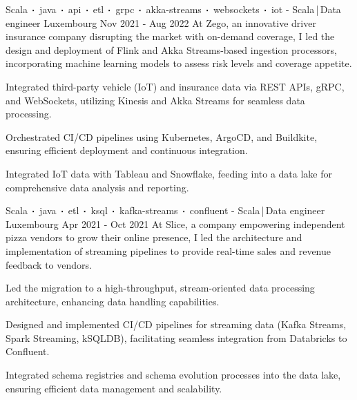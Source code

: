 \begin{cventries}

    \cventry
    {Scala$\sqbig$java$\sqbig$api$\sqbig$etl$\sqbig$grpc$\sqbig$akka-streams$\sqbig$websockets$\sqbig$iot}
    { - Scala\,|\,Data engineer}
    {Luxembourg}
    {Nov 2021 - Aug 2022}
    {At Zego, an innovative driver insurance company disrupting the market with on-demand coverage, I led the design and deployment of Flink and Akka Streams-based ingestion processors, incorporating machine learning models to assess risk levels and coverage appetite.}
    {
        \begin{cvitems}
            \item{Integrated third-party vehicle (IoT) and insurance data via REST APIs, gRPC, and WebSockets, utilizing Kinesis and Akka Streams for seamless data processing.}
            \item{Orchestrated CI/CD pipelines using Kubernetes, ArgoCD, and Buildkite, ensuring efficient deployment and continuous integration.}
            \item{Integrated IoT data with Tableau and Snowflake, feeding into a data lake for comprehensive data analysis and reporting.}
        \end{cvitems}
    }


    \cventry
    {Scala$\sqbig$java$\sqbig$etl$\sqbig$ksql$\sqbig$kafka-streams$\sqbig$confluent}
    { - Scala\,|\,Data engineer}
    {Luxembourg}
    {Apr 2021 - Oct 2021}
    {At Slice, a company empowering independent pizza vendors to grow their online presence, I led the architecture and implementation of streaming pipelines to provide real-time sales and revenue feedback to vendors.}
    {
        \begin{cvitems}
            \item{Led the migration to a high-throughput, stream-oriented data processing architecture, enhancing data handling capabilities.}
            \item{Designed and implemented CI/CD pipelines for streaming data (Kafka Streams, Spark Streaming, kSQLDB), facilitating seamless integration from Databricks to Confluent.}
            \item{Integrated schema registries and schema evolution processes into the data lake, ensuring efficient data management and scalability.}
        \end{cvitems}
    }


\end{cventries}
